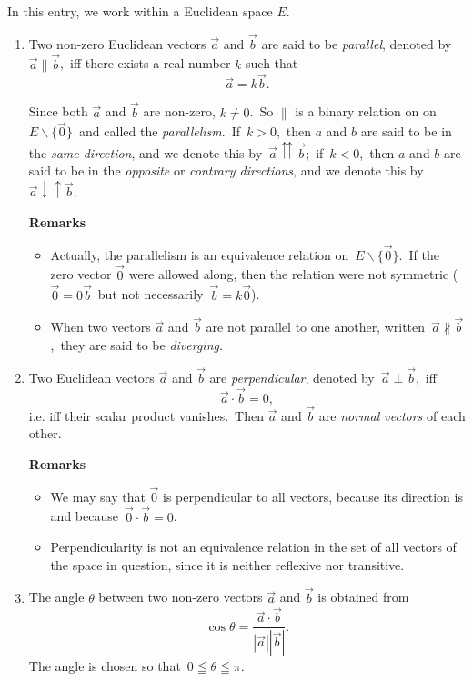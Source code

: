 \documentclass[12pt]{article}
\begin{document}
In this entry, we work within a Euclidean space $E$.

\begin{enumerate}
\item Two non-zero Euclidean vectors $\vec{a}$ and $\vec{b}$ are said to be {\em parallel}, denoted by\, $\vec{a}\parallel\vec{b}$,\, iff there exists a real number $k$ such that
$$\vec{a} = k\vec{b}.$$ 

Since both $\vec{a}$ and $\vec{b}$ are non-zero, $k\neq 0$.\, So $\parallel$ is a binary relation on on\, $E\!\smallsetminus\!\lbrace\vec{0}\rbrace$\, and called the {\em parallelism}.\, If\, $k > 0$,\, then $a$ and $b$ are said to be in the \emph{same direction}, and we denote this by\, $\vec{a}\upuparrows\vec{b}$;\, if\, $k < 0$,\, then $a$ and $b$ are said to be in the \emph{opposite} or \emph{contrary directions}, and we denote this by\, $\vec{a}\downarrow\uparrow\vec{b}$.

\textbf{Remarks} 
 \begin{itemize}
 \item Actually, the parallelism is an equivalence relation on\, 
$E\!\smallsetminus\!\lbrace\vec{0}\rbrace$.\, If the zero vector $\vec{0}$ were allowed along, then the relation were not symmetric ($\vec{0} = 0\vec{b}$\, but not necessarily\, $\vec{b} = k\vec{0}$).
 \item When two vectors $\vec{a}$ and $\vec{b}$ are not parallel to one another, written\, $\vec{a}\nparallel\vec{b}$,\, they are said to be {\em diverging}.
 \end{itemize}

\item Two Euclidean vectors $\vec{a}$ and $\vec{b}$ are {\em perpendicular}, denoted by\, $\vec{a}\perp\vec{b}$,\, iff 
                      $$\vec{a}\cdot\vec{b} = 0,$$
i.e. iff their scalar product vanishes.\, Then $\vec{a}$ and $\vec{b}$ are {\em normal vectors} of each other.

\textbf{Remarks} 
\begin{itemize}
 \item We may say that $\vec{0}$ is perpendicular to all vectors, because its direction is  and because\, $\vec{0}\cdot\vec{b} = 0$.
 \item Perpendicularity is not an equivalence relation in the set of all vectors of the space in question, since it is neither reflexive nor transitive.
 \end{itemize}

\item The angle $\theta$ between two non-zero vectors $\vec{a}$ and $\vec{b}$ is obtained from
$$\cos\theta = \frac{\vec{a}\cdot\vec{b}}{|\vec{a}||\vec{b}|}.$$
The angle is chosen so that\, $0 \leqq \theta \leqq \pi$.

\end{enumerate}
\end{document}
